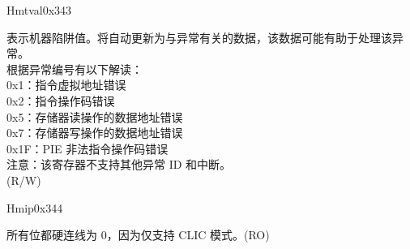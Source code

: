 \begin{register}{H}{mtval}{0x343}\label{regdesc:MTVAL}
%
\regnewline%
\begin{regdesc}\begin{reglist}
\label{fielddesc:MTVAL}\item [MTVAL] 表示机器陷阱值。将自动更新为与异常有关的数据，该数据可能有助于处理该异常。\\
根据异常编号有以下解读：\\
0x1：指令虚拟地址错误\\
0x2：指令操作码错误\\
0x5：存储器读操作的数据地址错误\\
0x7：存储器写操作的数据地址错误\\
0x1F：PIE 非法指令操作码错误\\
注意：该寄存器不支持其他异常 ID 和中断。\\
(R/W)
\end{reglist}\end{regdesc}
\end{register}

\begin{register}{H}{mip}{0x344}\label{regdesc:MIP_REG}
%
\regnewline%
\begin{regdesc}\begin{reglist}
\label{fielddesc:MIP}\item 所有位都硬连线为 0，因为仅支持 CLIC 模式。(RO)
\end{reglist}\end{regdesc}
\end{register}

